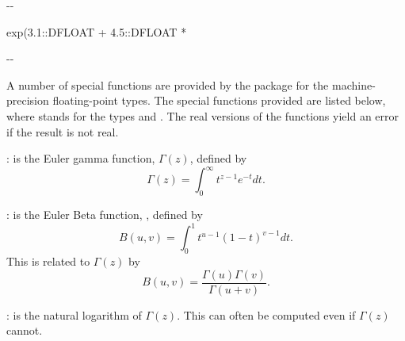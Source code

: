 {{{{{{{{{{{\begin{xtc}
\begin{TeXOutput}
\begin{fricasmath}{3}
-{}-{\TIMES \ImaginaryI }%
\end{fricasmath}
\end{TeXOutput}
\end{xtc}
\begin{xtc}
\begin{xtccomment}
\end{xtccomment}
\begin{spadsrc}
exp(3.1::DFLOAT + 4.5::DFLOAT * %
\end{spadsrc}
\begin{TeXOutput}
\begin{fricasmath}{4}
-{}-{\TIMES \ImaginaryI }%
\end{fricasmath}
\end{TeXOutput}
\end{xtc}
%
A number of special functions are provided by the package
 for the machine-precision
floating-point types.
The special functions provided are listed below, where  stands for
the types  and .
The real versions of the functions yield an error if the result is not real.

\noindent
{}: \hfill\newline
{} is the Euler gamma function,
   $\Gamma(z)$,
   defined by
\begin{displaymath}
\Gamma(z) = \int_{0}^{\infty} t^{z-1} e^{-t} dt.
\end{displaymath}

\noindent
{}: \hfill\newline
    is the Euler Beta function,
   , defined by
\begin{displaymath}
B(u,v) = \int_{0}^{1} t^{u-1} (1-t)^{v-1} dt.
\end{displaymath}
   This is related to $\Gamma(z)$ by
\begin{displaymath}
B(u,v) = \frac{\Gamma(u) \Gamma(v)}{\Gamma(u + v)}.
\end{displaymath}

\noindent
{}: \hfill\newline
    is the natural logarithm of
$\Gamma(z)$.
   This can often be computed even if $\Gamma(z)$
cannot.
%

}}}}}}}}}}}
